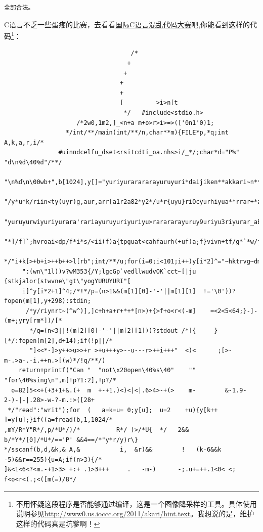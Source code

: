 \documentclass[a4paper]{book}
\begin{document}
{\footnotesize\begin{shaded}\begin{verbatim}
全部合法。
\end{verbatim}\end{shaded}}
C语言不乏一些蛋疼的比赛，去看看\href{http://www0.us.ioccc.org/years.html}{国际C语言混乱代码大赛}吧,你能看到这样的代码\footnote{不用怀疑这段程序是否能够通过编译，这是一个图像降采样的工具。具体使用说明参见\url{http://www0.us.ioccc.org/2011/akari/hint.text}。我想说的是，维护这样的代码真是坑爹啊！}：

{\footnotesize\begin{shaded}\begin{verbatim}
	                               /*
	                              +
	                             +
	                            +
	                            +
	                            [         >i>n[t
	                             */   #include<stdio.h>
	                /*2w0,1m2,]_<n+a m+o>r>i>=>(['0n1'0)1;
	             */int/**/main(int/**/n,char**m){FILE*p,*q;int        A,k,a,r,i/*
	           #uinndcelfu_dset<rsitcdti_oa.nhs>i/_*/;char*d="P%"   "d\n%d\40%d"/**/
	         "\n%d\n\00wb+",b[1024],y[]="yuriyurarararayuruyuri*daijiken**akkari~n**"
	  "/y*u*k/riin<ty(uyr)g,aur,arr[a1r2a82*y2*/u*r{uyu}riOcyurhiyua**rrar+*arayra*="
       "yuruyurwiyuriyurara'rariayuruyuriyuriyu>rarararayuruy9uriyu3riyurar_aBrMaPrOaWy^?"
      "*]/f]`;hvroai<dp/f*i*s/<ii(f)a{tpguat<cahfaurh(+uf)a;f}vivn+tf/g*`*w/jmaa+i`ni("/**
     */"i+k[>+b+i>++b++>l[rb";int/**/u;for(i=0;i<101;i++)y[i*2]^="~hktrvg~dmG*eoa+%squ#l2"
     ":(wn\"1l))v?wM353{/Y;lgcGp`vedllwudvOK`cct~[|ju {stkjalor(stwvne\"gt\"yogYURUYURI"[
     i]^y[i*2+1]^4;/*!*/p=(n>1&&(m[1][0]-'-'||m[1][1]  !='\0'))?fopen(m[1],y+298):stdin;
      /*y/riynrt~(^w^)],]c+h+a+r+*+*[n>)+{>f+o<r<(-m]    =<2<5<64;}-]-(m+;yry[rm*])/[*
       */q=(n<3||!(m[2][0]-'-'||m[2][1]))?stdout /*]{     }[*/:fopen(m[2],d+14);if(!p||/*
       "]<<*-]>y++>u>>+r >+u+++y>--u---r>++i+++"  <)<      ;[>-m-.>a-.-i.++n.>[(w)*/!q/**/)
    return+printf("Can "  "not\x20open\40%s\40"    ""       "for\40%sing\n",m[!p?1:2],!p?/*
  o=82]5<<+(+3+1+&.(+  m  +-+1.)<)<|<|.6>4>-+(>    m-        &-1.9-2-)-|-|.28>-w-?-m.:>([28+
 */"read":"writ");for  (   a=k=u= 0;y[u];  u=2    +u){y[k++   ]=y[u];}if((a=fread(b,1,1024/*
,mY/R*Y"R*/,p/*U*/)/*          R*/ )>/*U{  */   2&& b/*Y*/[0]/*U*/=='P' &&4==/*"y*r/y)r\}
*/sscanf(b,d,&k,& A,&           i,  &r)&&        !   (k-6&&k -5)&&r==255){u=A;if(n>3){/*
]&<1<6<?<m.-+1>3> +:+ .1>3+++     .   -m-)      -;.u+=++.1<0< <; f<o<r<(.;<([m(=)/8*/

\end{verbatim}
\end{shaded}}
\end{document}
